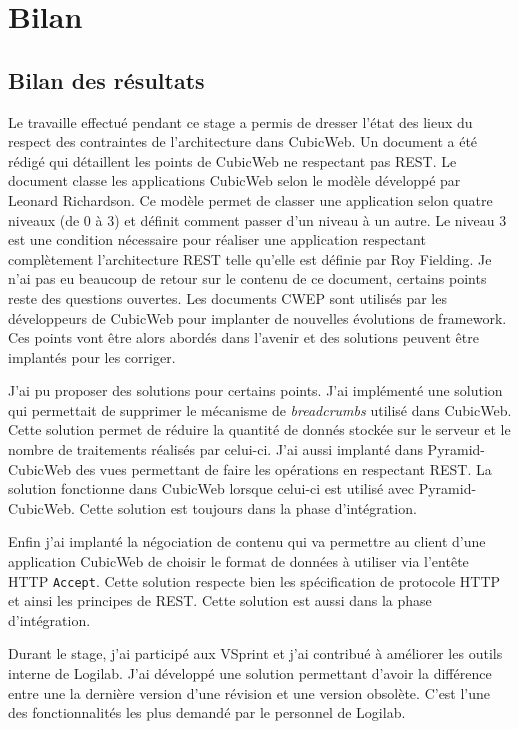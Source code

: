 \chapter{Bilan}
\section{Bilan des résultats}
Le travaille effectué pendant ce stage a permis de dresser l'état des lieux du respect des contraintes de l'architecture  dans CubicWeb. Un document  a été rédigé qui détaillent les points de CubicWeb ne respectant pas REST. Le document classe les applications CubicWeb selon le modèle développé par Leonard Richardson\cite{rmm}. Ce modèle permet de classer une application selon quatre niveaux (de 0 à 3) et définit comment passer d'un niveau à un autre. Le niveau 3 est une condition nécessaire pour réaliser une application respectant complètement l'architecture REST telle qu'elle est définie par Roy Fielding. Je n'ai pas eu beaucoup de retour sur le contenu de ce document, certains points reste des questions ouvertes. Les documents CWEP sont utilisés par les développeurs de CubicWeb pour implanter de nouvelles évolutions de framework. Ces points vont être alors abordés dans l'avenir et des solutions peuvent être implantés pour les corriger. 

J'ai pu proposer des solutions pour certains points. J'ai implémenté une solution qui permettait de supprimer le mécanisme de \textit{breadcrumbs} utilisé dans CubicWeb. Cette solution permet de réduire la quantité de donnés stockée sur le serveur et le nombre de traitements réalisés par celui-ci. J'ai aussi implanté dans Pyramid-CubicWeb des vues permettant de faire les opérations  en respectant REST. La solution fonctionne dans CubicWeb lorsque celui-ci est utilisé avec Pyramid-CubicWeb. Cette solution est toujours dans la phase d'intégration.

Enfin j'ai implanté la négociation de contenu qui va permettre au client d'une application CubicWeb de choisir le format de données à utiliser via l'entête HTTP \texttt{Accept}. Cette solution respecte bien les spécification de protocole HTTP et ainsi les principes de REST. Cette solution est aussi dans la phase d'intégration.

Durant le stage, j'ai participé aux VSprint et j'ai contribué à améliorer les outils interne de Logilab. J'ai développé une solution permettant d'avoir la différence entre une la dernière version d'une révision et une version obsolète. C'est l'une des fonctionnalités les plus demandé par le personnel de Logilab.     

